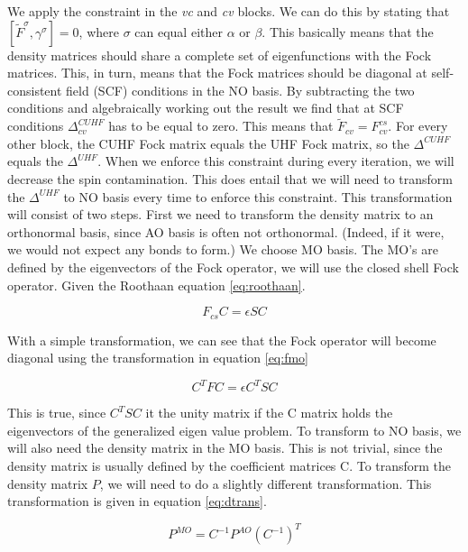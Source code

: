 \documentclass[twoside,twocolumn,9pt]{article}
\begin{document}
We apply the constraint in the \textit{vc} and \textit{cv} blocks. We can do this by stating that $[\tilde{F}^\sigma, \gamma^\sigma] = 0$, where $\sigma$ can equal either $\alpha$
or $\beta$. This basically means that the density matrices should share a complete set of eigenfunctions with the Fock matrices. This, in turn, means that the Fock matrices should be
diagonal at self-consistent field (SCF) conditions in the NO basis. By subtracting the two conditions and algebraically working out the result we find that at SCF conditions
$\Delta^{CUHF}_{cv}$ has to be equal to zero. This means that $\tilde{F}_{cv} = F_{cv}^{cs}$\cite{Scuseria2010}. For every other block, the CUHF Fock matrix equals the UHF Fock matrix,
so the $\Delta^{CUHF}$ equals the $\Delta^{UHF}$. When we enforce this constraint during every iteration, we will decrease the spin contamination. This does entail that we will need
to transform the $\Delta^{UHF}$ to NO basis every time to enforce this constraint. This transformation will consist of two steps. First we need to transform the density matrix to
an orthonormal basis, since AO basis is often not orthonormal. (Indeed, if it were, we would not expect any bonds to form.) We choose MO basis. The MO's are defined by the
eigenvectors of the Fock operator, we will use the closed shell Fock operator. Given the Roothaan equation \eqref{eq:roothaan}.

\begin{equation}\label{eq:roothaan}
  F_{cs}C = \epsilon S C
\end{equation}

With a simple transformation, we can see that the Fock operator will become diagonal using the transformation in equation \eqref{eq:fmo}

\begin{equation}\label{eq:fmo}
  C^T F C = \epsilon C^T S C
\end{equation}

This is true, since $C^T S C$ it the unity matrix if the C matrix holds the eigenvectors of the generalized eigen value problem. To transform to NO basis, we will also need the
density matrix in the MO basis. This is not trivial, since the density matrix is usually defined by the coefficient matrices C. To transform the density matrix $P$, we will need
to do a slightly different transformation. This transformation is given in equation \eqref{eq:dtrans}\cite{Declercq2020}.

\begin{equation}\label{eq:dtrans}
  P^{MO} = C^{-1}P^{AO}(C^{-1})^T
\end{equation}
\end{document}
